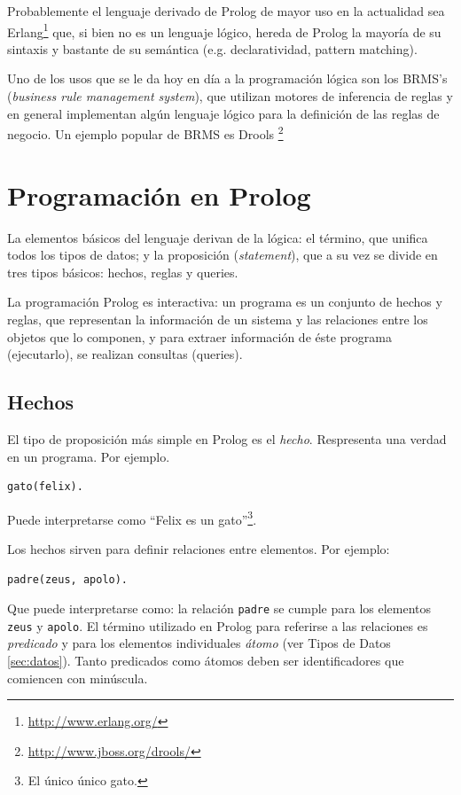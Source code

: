 \documentclass[12pt,titlepage]{article}
\begin{document}
Probablemente el lenguaje derivado de Prolog de mayor uso en la actualidad sea Erlang\footnote{\url{http://www.erlang.org/}} que, si bien no es un lenguaje lógico, hereda de Prolog la mayoría de su sintaxis y bastante de su semántica (e.g. declaratividad, pattern matching).

Uno de los usos que se le da hoy en día a la programación lógica son los BRMS's (\emph{business rule management system}), que utilizan motores de inferencia de reglas y en general implementan algún lenguaje lógico para la definición de las reglas de negocio. Un ejemplo popular de BRMS es Drools \footnote{\url{http://www.jboss.org/drools/}}

\newpage
\section{Programación en Prolog}

La elementos básicos del lenguaje derivan de la lógica: el término, que unifica todos los tipos de datos; y la proposición (\emph{statement}), que a su vez se divide en tres tipos básicos: hechos, reglas y queries.

La programación Prolog es interactiva: un programa es un conjunto de hechos y reglas, que representan la información de un sistema y las relaciones entre los objetos que lo componen, y para extraer información de éste programa (ejecutarlo), se realizan consultas (queries). 

\subsection{Hechos}

El tipo de proposición más simple en Prolog es el \emph{hecho}. Respresenta una verdad en un programa. Por ejemplo.
\begin{lstlisting}
gato(felix).
\end{lstlisting}
Puede interpretarse como ``Felix es un gato''\footnote{El único único gato.}.

Los hechos sirven para definir relaciones entre elementos. Por ejemplo:
\begin{lstlisting}
padre(zeus, apolo).
\end{lstlisting}
Que puede interpretarse como: la relación \lstinline|padre| se cumple para los elementos \lstinline|zeus| y \lstinline|apolo|. El término utilizado en Prolog para referirse a las relaciones es \emph{predicado} y para los elementos individuales \emph{átomo} (ver Tipos de Datos \ref{sec:datos}). Tanto predicados como átomos deben ser identificadores que comiencen con minúscula.
\end{document}
